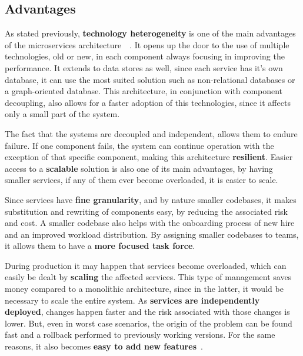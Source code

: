 
\subsection{Advantages}
\label{ss:microservices-advantages}


As stated previously, \textbf{technology heterogeneity} is one of the main advantages of the microservices architecture~~\cite{technology-heterogeneity}. It opens up the door to the use of multiple technologies, old or new, in each component always focusing in improving the performance. It extends to data stores as well, since each service has it's own database, it can use the most suited solution such as non-relational databases or a  graph-oriented database. This architecture, in conjunction with component decoupling, also allows for a faster adoption of this technologies, since it affects only a small part of the system.

The fact that the systems are decoupled and independent, allows them to endure failure. If one component fails, the system can continue operation with the exception of that specific component, making this architecture \textbf{resilient}. Easier access to a \textbf{scalable} solution is also one of its main advantages, by having smaller services, if any of them ever become overloaded, it is easier to scale. 

Since services have \textbf{fine granularity}, and by nature smaller \gls{codebase}s, it makes substitution and rewriting of components easy, by reducing the associated risk and cost. A smaller \gls{codebase} also helps with the onboarding process of new hire and an improved workload distribution. By assigning smaller codebases to teams, it allows them to have a \textbf{more focused task force}.

During production it may happen that services become overloaded, which can easily be dealt by \textbf{scaling} the affected services. This type of management saves money compared to a monolithic architecture, since in the latter, it would be necessary to scale the entire system. As \textbf{services are independently deployed}, changes happen faster and the risk associated with those changes is lower. But, even in worst case scenarios, the origin of the problem can be found fast and a rollback performed to previously working versions. For the same reasons, it also becomes \textbf{easy to add new features}~\cite{9213058}.

